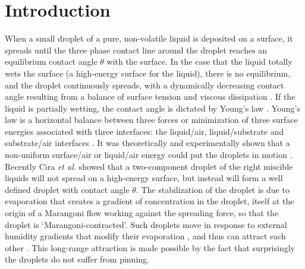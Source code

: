 \documentclass[aps,prl,reprint,superscriptaddress,amsmath,amssymb,]{revtex4-1}
\begin{document}
\section*{Introduction}
When a small droplet of a pure, non-volatile liquid is deposited on a surface, it spreads until the three phase contact line around the droplet reaches an equilibrium contact angle $\theta$ with the surface. In the case that the liquid totally wets the surface (a high-energy surface for the liquid), there is no equilibrium, and the droplet continuously spreads, with a dynamically decreasing contact angle resulting from a balance of surface tension and viscous dissipation \cite{tanner1979spreading, lelah1981spreading}. If the liquid is partially wetting, the contact angle is dictated by Young's law \cite{young1805essay}. Young's law is a horizontal balance between three forces or minimization of three surface energies associated with three interfaces: the liquid/air, liquid/substrate and substrate/air interfaces \cite{deGennes-1985}. It was theoretically and experimentally shown that a non-uniform surface/air or liquid/air energy could put the droplets in motion \cite{Brochard-1989, ondarccuhu1992etalement, Chaudhury-1992}. Recently Cira \textit{et al.} \cite{Cira-2015, Cira-2014} showed that a two-component droplet of the right miscible liquids will not spread on a high-energy surface, but instead will form a well defined droplet with contact angle $\theta$. The stabilization of the droplet is due to evaporation that creates a gradient of concentration in the droplet, itself at the origin of a Marangoni flow working against the spreading force, so that the droplet is `Marangoni-contracted'. Such droplets move in response to external humidity gradients that modify their evaporation \cite{pradhan2015deposition}, and thus can attract each other \cite{Cira-2015}. This long-range attraction is made possible by the fact that surprisingly the droplets do not suffer from pinning.
\end{document}
